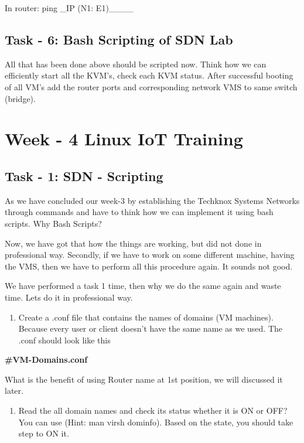 \documentclass[letterpaper,10pt,english]{sphinxmanual}
\begin{document}
In router: ping \_IP (N1: E1)\_\_\_\_


\section{Task - 6: Bash Scripting of SDN Lab}
\label{week-03:task-6-bash-scripting-of-sdn-lab}
All that has been done above should be scripted now. Think how we can efficiently start all the KVM's, check each KVM status. After successful booting of all VM's add the router ports and corresponding network VMS to same switch (bridge).


\chapter{Week - 4 Linux IoT Training}
\label{week-04:week-4-linux-iot-training}\label{week-04:week-04}\label{week-04::doc}

\section{Task - 1: SDN - Scripting}
\label{week-04:task-1-sdn-scripting}
As we have concluded our week-3 by establishing the Techknox Systems Networks through commands and have to think how we can implement it using bash scripts. Why Bash Scripts?

Now, we have got that how the things are working, but did not done in professional way. Secondly, if we have to work on some different machine, having the VMS, then we have to perform all this procedure again. It sounds not good.

We have performed a task 1 time, then why we do the same again and waste time. Lets do it in professional way.
\begin{enumerate}
\item {} 
Create a .conf file that contains the names of domains (VM machines). Because every user or client doesn't have the same name as we used. The .conf should look like this

\end{enumerate}

\textbf{\#VM-Domains.conf}


What is the benefit of using Router name at 1st position, we will discussed it later.
\begin{enumerate}
\item {} 
Read the all domain names and check its status whether it is ON or OFF? You can use (Hint: man virsh dominfo). Based on the state, you should take step to ON it.

\end{enumerate}
\end{document}
